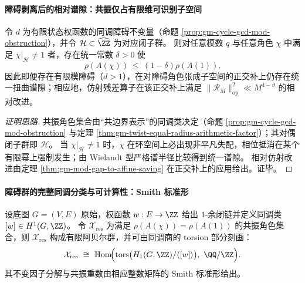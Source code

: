 \paragraph{障碍剥离后的相对谱隙：共振仅占有限维可识别子空间}
\begin{theorem}\label{thm:gm-relative-gap-after-obstruction}
令 \(d\) 为有限状态权函数的同调障碍不变量（命题 \ref{prop:gm-cycle-gcd-mod-obstruction}），并令 \(\mathcal{H}\subset\widehat{\ZZ}\) 为对应闭子群。
则对任意模数 \(q\) 与任意角色 \(\chi\) 中满足 \(\chi|_{\mathcal{H}}\neq 1\) 者，存在统一常数 \(\delta>0\) 使
\[
\rho(A(\chi))\ \le\ (1-\delta)\rho(A(1)).
\]
因此即便存在有限模障碍（\(d>1\)），在对障碍角色张成子空间的正交补上仍存在统一扭曲谱隙；相应地，仿射残差算子在该正交补上满足 \(\|\mathcal{R}_M\|_{\mathrm{op}}^2\ll M^{4-\vartheta}\) 的相对改进。
\end{theorem}

\begin{proof}[证明思路]
共振角色集合由“共边界表示”的同调类决定（命题 \ref{prop:gm-cycle-gcd-mod-obstruction} 与定理 \ref{thm:gm-twist-equal-radius-arithmetic-factor}）；其对偶闭子群即 \(\mathcal{H}\)。
当 \(\chi|_{\mathcal{H}}\neq 1\) 时，\(\chi\) 在环空间上必出现非平凡失配，相位抵消在某个有限幂上强制发生；由 Wielandt 型严格谱半径比较得到统一谱隙。
相对仿射改进由定理 \ref{thm:gm-mod-gap-to-affine-saving} 在正交补上的应用给出。证毕。
\end{proof}

\paragraph{障碍群的完整同调分类与可计算性：Smith 标准形}
\begin{theorem}\label{thm:gm-resonant-character-group-homology}
设底图 \(G=(V,E)\) 原始，权函数 \(w:E\to\ZZ\) 给出 \(1\)-余闭链并定义同调类 \([w]\in H^1(G,\ZZ)\)。
令 \(\mathcal{X}_{\mathrm{res}}\) 为满足 \(\rho(A(\chi))=\rho(A(1))\) 的共振角色集合，则 \(\mathcal{X}_{\mathrm{res}}\) 构成有限阿贝尔群，并可由同调商的 torsion 部分刻画：
\[
\mathcal{X}_{\mathrm{res}}\ \cong\ \mathrm{Hom}\!\Bigl(\mathrm{tors}\bigl(H_1(G,\ZZ)/\langle[w]\rangle\bigr),\ \QQ/\ZZ\Bigr).
\]
其不变因子分解与共振重数由相应整数矩阵的 Smith 标准形给出。
\end{theorem}

